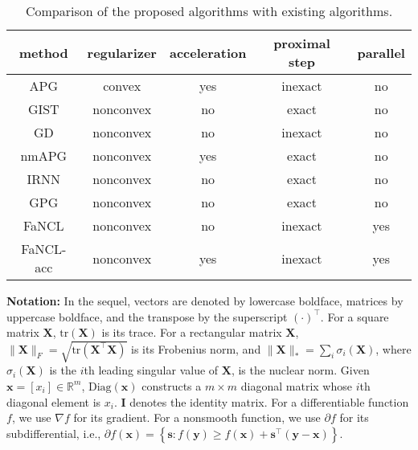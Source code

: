 \documentclass[10pt,journal,compsoc]{IEEEtran}
\def \R{\mathbb R}
\newcommand{\X}{\mathbf{X}}
\newcommand{\NM}[2]{\| #1 \|_{#2} }
\newcommand{\Tr}[1]{\text{tr}( #1 ) }
\newcommand{\Diag}[1]{\text{Diag}(#1)}
\begin{document}
\begin{table}[ht]
\centering
\caption{Comparison of the proposed algorithms with existing algorithms.}
\vspace{-10px}
\begin{tabular}{ c | c | c | C{35px} | c }
	\hline
	method                                     & regularizer & acceleration & proximal step & parallel \\ \hline
	\textsf{APG} \cite{schmidt2011convergence} & convex      & yes          & inexact       & no       \\ \hline
	\textsf{GIST} \cite{gongZLHY2013}          & nonconvex   & no           & exact         & no       \\ \hline
	\textsf{GD} \cite{attouch2013convergence}  & nonconvex   & no           & inexact       & no       \\ \hline
	\textsf{nmAPG}  \cite{li2015accelerated}   & nonconvex   & yes          & exact         & no       \\ \hline
	\textsf{IRNN}  \cite{lu2016nonconvex}      & nonconvex   & no           & exact         & no       \\ \hline
	\textsf{GPG}  \cite{lu2015generalized}     & nonconvex   & no           & exact         & no       \\ \hline
	\textsf{FaNCL}                             & nonconvex   & no           & inexact       & yes      \\ \hline
	\textsf{FaNCL-acc}                         & nonconvex   & yes          & inexact       & yes      \\ \hline
\end{tabular}
\label{tab:comp}
\end{table}

\noindent
\textbf{Notation:}
In the sequel, 
 vectors are denoted by lowercase
boldface, matrices by uppercase boldface,
and the transpose by the superscript $(\cdot)^\top$. 
For a 
square matrix $\mathbf{X}$,
$\Tr{\X}$ is its trace.
For a rectangular matrix $\mathbf{X}$,
$\NM{\X}{F} = \sqrt{\Tr{\X^{\top} \X}}$ is its Frobenius norm, 
and $\NM{\X}{*} = 
\sum_i
\sigma_i( \X )$, where $\sigma_i( \X )$
is the $i$th leading singular value of $\X$, 
is the nuclear norm.
Given $\mathbf{x} = [x_i] \in \R^{m}$, 
$\Diag{\mathbf{x}}$ constructs a $m \times m$ diagonal matrix whose $i$th diagonal element is $x_i$.  
$\mathbf{I}$ denotes the identity matrix.
For a differentiable function $f$, we use $\nabla f$ for its gradient.
For a nonsmooth function,
we use $\partial f$ for its subdifferential,
i.e.,
$\partial f(\mathbf{x}) = \left\lbrace \mathbf{s} 
: f(\mathbf{y}) \ge f(\mathbf{x}) + \mathbf{s}^{\top} (\mathbf{y} - \mathbf{x}) \right\rbrace$.
\end{document}
